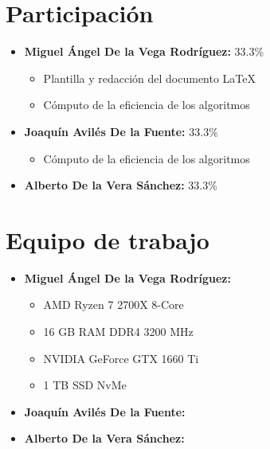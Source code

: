 \documentclass[11pt]{article}
\begin{document}
                                                

\tableofcontents %

\newpage %

\section{Participación}
\begin{itemize}
    \item \textbf{Miguel Ángel De la Vega Rodríguez:} 33.3\%
    \begin{itemize}
        \item Plantilla y redacción del documento \LaTeX
        \item Cómputo de la eficiencia de los algoritmos
    \end{itemize}
    \item \textbf{Joaquín Avilés De la Fuente:} 33.3\%
    \begin{itemize}
        \item Cómputo de la eficiencia de los algoritmos
    \end{itemize}
    \item \textbf{Alberto De la Vera Sánchez: } 33.3\%
\end{itemize}

\section{Equipo de trabajo}

\begin{itemize}
    \item \textbf{Miguel Ángel De la Vega Rodríguez:}
        \begin{itemize}
            \item AMD Ryzen 7 2700X 8-Core
            \item 16 GB RAM DDR4 3200 MHz
            \item NVIDIA GeForce GTX 1660 Ti 
            \item 1 TB SSD NvMe 
        \end{itemize}
    \item \textbf{Joaquín Avilés De la Fuente:}
    \item \textbf{Alberto De la Vera Sánchez:}
\end{itemize}
\end{document}
